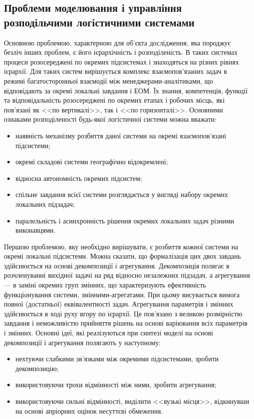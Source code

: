 \subsection{Проблеми моделювання і управління розподільчими логістичними системами}
Основною проблемою, характерною для об'єкта дослідження, яка породжує безліч інших проблем, є його ієрархічність і розподіленість. 
В таких системах процеси розосереджені по окремих підсистемах і знаходяться на різних рівнях ієрархії. 
Для таких систем вирішується комплекс взаємопов'язаних задач в режимі багатосторонньої взаємодії між менеджерами-аналітиками, що відповідають за окремі локальні завдання і ЕОМ. 
Їх знання, компетенція, функції та відповідальність розосереджені по окремих етапах і робочих місць, які пов'язані як <<по вертикалі>>, так і <<по горизонталі>>.
Основними ознаками розподіленості будь-якої логістичної системи можна вважати:
\begin{itemize}
	\item наявність механізму розбиття даної системи на окремі взаємопов'язані підсистеми;
	\item окремі складові системи географічно відокремлені;
	\item відносна автономність окремих підсистем;
	\item спільне завдання всієї системи розглядається у вигляді набору окремих локальних підзадач;
	\item паралельність і асинхронність рішення окремих локальних задач різними виконавцями.
\end{itemize}

Першою проблемою, яку необхідно вирішувати, є розбиття кожної системи на окремі локальні підсистеми. 
Можна сказати, що формалізація цих двох завдань здійснюється на основі декомпозиції і агрегування. 
Декомпозиція полягає в розчленуванні вихідної задачі на ряд відносно незалежних підзадач, а агрегування --- в заміні окремих груп змінних, що характеризують ефективність функціонування системи, змінними-агрегатами. 
При цьому висувається вимога повної (достатньої) еквівалентності задач. 
Агрегування параметрів і змінних здійснюється в ході руху вгору по ієрархії. 
Це пов'язано з великою розмірністю завдання і неможливістю прийняття рішень на основі варіювання всіх параметрів і змінних. 
Основні ідеї, які реалізуються при синтезі моделі на основі декомпозиції і агрегування полягають у наступному:
\begin{itemize}
\item нехтуючи слабкими зв'язками між окремими підсистемами, зробити декомпозицію;
\item використовуючи трохи відмінності між ними, зробити агрегування;
\item використовуючи сильні відмінності, виділити <<вузькі місця>>, відкинувши на основі апріорних оцінок несуттєві обмеження.
\end{itemize}

